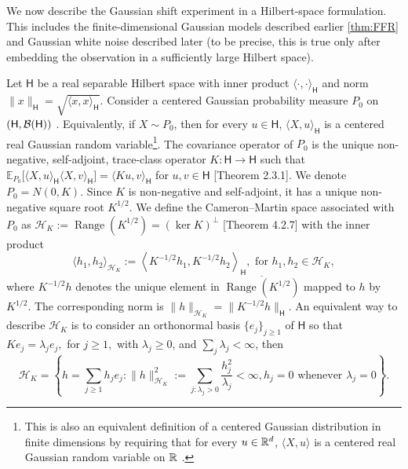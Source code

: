 We now describe the Gaussian shift experiment in a Hilbert-space formulation. This includes the finite-dimensional
Gaussian models described earlier \ref{thm:FFR} and Gaussian white noise described later (to be precise, this is true only after embedding the observation in a sufficiently large Hilbert space).



Let \(\mathsf H\) be a real separable Hilbert space with inner product $\langle \cdot,\cdot\rangle_{\mathsf H}$ and norm $\|x\|_{\mathsf H} = \sqrt{\langle x,x\rangle_{\mathsf H}}.$ Consider a centered Gaussian probability measure $P_0$ on $(\mathsf H, \mathcal{B}(\mathsf H))$ \cite{gine2016mathematical, Bogachev1998GaussianMeasures}. Equivalently, if \(X\sim P_0\), then for every \(u\in\mathsf H\), $\langle X,u\rangle_{\mathsf H}$ is a centered real Gaussian random variable\footnote{This is also an equivalent definition of a centered Gaussian distribution in finite dimensions by requiring that for every \(u\in\mathbb{R}^d\), $\langle X,u\rangle$ is a centered real Gaussian random variable on $\mathbb{R}$ \citet{krishnapur2025gaussian}.}. The covariance operator of \(P_0\) is the unique non-negative, self-adjoint, trace-class operator $K:\mathsf H\to\mathsf H $
such that  $\mathbb E_{P_0}
    \bigl[
        \langle X,u\rangle_{\mathsf H}
        \langle X,v\rangle_{\mathsf H}
    \bigr]
    =
    \langle Ku,v\rangle_{\mathsf H}$  for $u,v\in\mathsf H$ \citet{Bogachev1998GaussianMeasures}[Theorem 2.3.1]. We denote $P_0=N(0,K).$ Since \(K\) is  non-negative  and self-adjoint, it has a unique  non-negative square root \(K^{1/2}\). We define the Cameron--Martin space associated with
\(P_0\)  as  $\mathcal H_K :=\operatorname{Range}(K^{1/2}) = (\ker K)^\perp$ \citet{lunardi2016infinite}[Theorem 4.2.7] with the inner product 
\[
    \langle h_1,h_2\rangle_{\mathcal H_K}
    :=
    \left\langle
        K^{-1/2}h_1,
        K^{-1/2}h_2
    \right\rangle_{\mathsf H},
   \text{ for }h_1,h_2\in\mathcal H_K,
\]
where \(K^{-1/2}h\) denotes the unique element in
\(\overline{\operatorname{Range}(K^{1/2})}\) mapped to \(h\) by
\(K^{1/2}\). The corresponding norm is $\|h\|_{\mathcal H_K} = \|K^{-1/2}h\|_{\mathsf H}.$ An equivalent way to describe  $\mathcal H_K$ is to consider an orthonormal basis  \(\{e_j\}_{j\ge 1}\)  of \(\mathsf H\) so that $K e_j=\lambda_j e_j,$ for $ j\ge 1,$  with 
\(\lambda_j\ge 0\), and \(\sum_j\lambda_j<\infty\), then
\begin{equation}
    \mathcal H_K
    =
    \left\{
        h=\sum_{j\ge 1} h_j e_j:
       \|h\|_{\mathcal H_K}^2:=  \sum_{j:\lambda_j>0}\frac{h_j^2}{\lambda_j}<\infty,
        h_j=0 \text{ whenever } \lambda_j=0
        \right\}.
\end{equation}

